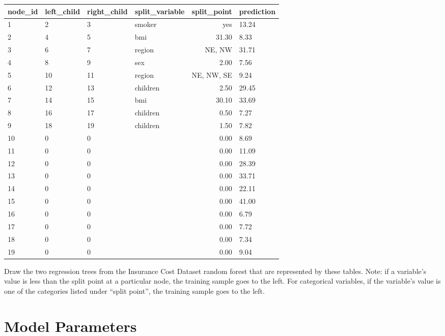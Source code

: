 \begin{center}
{\begin{tabular}{llllrl}
  \hline
 node\_id & left\_child & right\_child & split\_variable & split\_point & prediction \\ 
  \hline
  1 & 2 & 3 & smoker & yes & 13.24 \\ 
  2 & 4 & 5 & bmi & 31.30 & 8.33 \\ 
  3 & 6 & 7 & region & NE, NW & 31.71 \\ 
  4 & 8 & 9 & sex & 2.00 & 7.56 \\ 
  5 & 10 & 11 & region & NE, NW, SE & 9.24 \\ 
  6 & 12 & 13 & children & 2.50 & 29.45 \\ 
  7 & 14 & 15 & bmi & 30.10 & 33.69 \\ 
  8 & 16 & 17 & children & 0.50 & 7.27 \\ 
  9 & 18 & 19 & children & 1.50 & 7.82 \\ 
  10 & 0 & 0 &  & 0.00 & 8.69 \\ 
  11 & 0 & 0 &  & 0.00 & 11.09 \\ 
  12 & 0 & 0 &  & 0.00 & 28.39 \\ 
  13 & 0 & 0 &  & 0.00 & 33.71 \\ 
  14 & 0 & 0 &  & 0.00 & 22.11 \\ 
  15 & 0 & 0 &  & 0.00 & 41.00 \\ 
  16 & 0 & 0 &  & 0.00 & 6.79 \\ 
  17 & 0 & 0 &  & 0.00 & 7.72 \\ 
  18 & 0 & 0 &  & 0.00 & 7.34 \\ 
  19 & 0 & 0 &  & 0.00 & 9.04 \\ 
   \hline
\end{tabular}
}
\end{center}

\vspace{3mm}

\begin{question}{}
Draw the two regression trees from the Insurance Cost Dataset random forest that are represented by these tables. Note: if a variable's value is less than the split point at a particular node, the training sample goes to the left. For categorical variables, if the variable's value is one of the categories listed under ``split point'', the training sample goes to the left. 
\end{question}


\section{Model Parameters}

